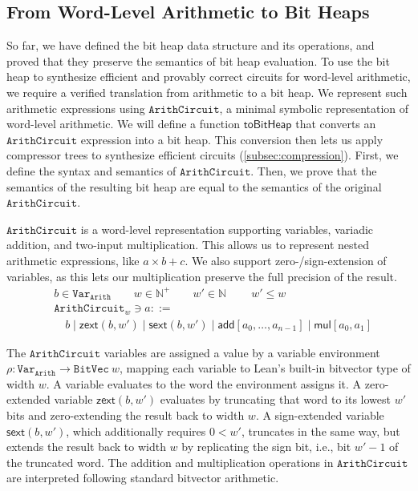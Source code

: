\documentclass[conference]{IEEEtran}
\newcommand{\Arith}{\ensuremath{\texttt{ArithCircuit}}\xspace}
\theoremstyle{plain}
\theoremstyle{definition}
\begin{document}
\subsection{From Word-Level Arithmetic to Bit Heaps}\label{subsec:to_bitheap}
So far, we have defined the bit heap data structure and its operations, and proved that they preserve the semantics of bit heap evaluation.
To use the bit heap to synthesize efficient and provably correct circuits for word-level arithmetic, we require a verified translation from arithmetic to a bit heap.
We represent such arithmetic expressions using \Arith, a minimal symbolic
representation of word-level arithmetic. 
We will define a function $\mathsf{toBitHeap}$ that converts an \Arith expression into a bit heap.
This conversion then lets us apply compressor trees to synthesize efficient circuits (\autoref{subsec:compression}).
First, we define the syntax and semantics of \Arith.
Then, we prove that the semantics of the resulting bit heap are equal to the semantics of the original \Arith.

\Arith is a word-level representation supporting variables,
variadic addition, and two-input multiplication.
This allows us to represent nested arithmetic expressions, like $a\times b + c$.
We also support zero-/sign-extension of variables, as this lets our multiplication preserve the full precision of the result.
\begin{align*}
&b \in \texttt{Var}_{\texttt{Arith}} \qquad w \in \mathbb{N}^{+} \qquad w' \in \mathbb{N} \qquad \ w' \leq w\\
&\mathtt{ArithCircuit}_w \ni a ::= \\
&\quad b \mid \mathsf{zext}(b, w') \mid \mathsf{sext}(b, w') \mid \mathsf{add}[a_0,\dots,a_{n-1}] \mid \mathsf{mul}[a_0, a_1]
\end{align*}

The \Arith variables are assigned a value by a variable environment $\rho : \texttt{Var}_{\texttt{Arith}} \to \mathtt{BitVec}\ w$, mapping each variable to Lean's built-in bitvector type of width $w$.
A variable evaluates to the word the environment assigns it.
A zero-extended variable $\mathsf{zext}(b,w')$ evaluates by truncating that word to its lowest $w'$ bits and zero-extending the result back to width $w$.
A sign-extended variable $\mathsf{sext}(b,w')$, which additionally requires $0 < w'$, truncates in the same way, but extends the result back to width $w$ by replicating the sign bit, i.e., bit $w'-1$ of the truncated word.
The addition and multiplication operations in \Arith are interpreted following standard bitvector arithmetic.
\end{document}
